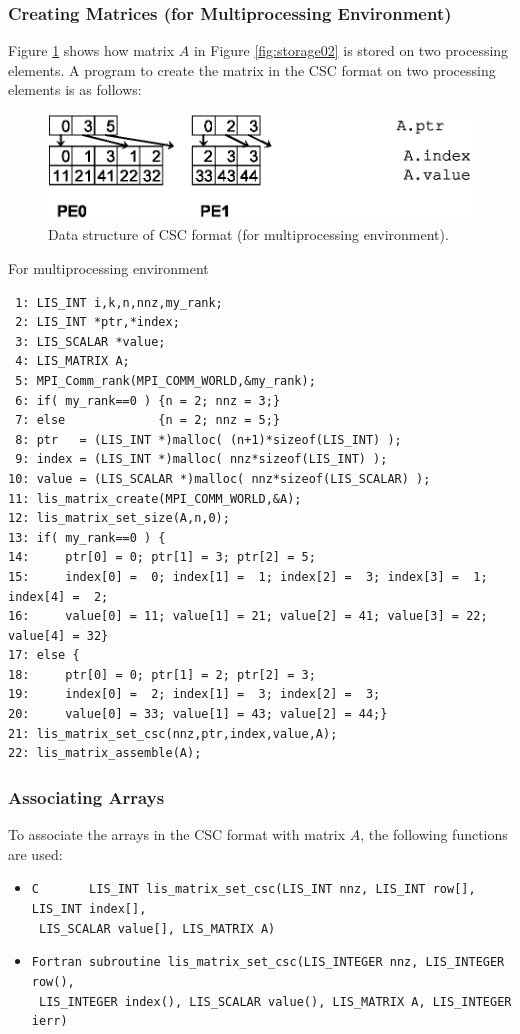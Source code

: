 \documentclass[a4paper]{article}
\begin{document}
\subsubsection{Creating Matrices (for Multiprocessing Environment)}
Figure \ref{fig:storage02_mpi} shows how matrix $A$ in Figure
\ref{fig:storage02} is stored on two processing elements. A program to create the
matrix in the CSC format on two processing elements is as follows:
\begin{figure}[h]
{\centering 
\includegraphics{storage02_mpi.eps} 
\caption{Data structure of CSC format (for multiprocessing environment).}\label{fig:storage02_mpi}}
\end{figure}
\begin{itemsquarebox}[l]{For multiprocessing environment}
\small
\begin{verbatim}
 1: LIS_INT i,k,n,nnz,my_rank;
 2: LIS_INT *ptr,*index;
 3: LIS_SCALAR *value;
 4: LIS_MATRIX A;
 5: MPI_Comm_rank(MPI_COMM_WORLD,&my_rank);
 6: if( my_rank==0 ) {n = 2; nnz = 3;}
 7: else             {n = 2; nnz = 5;}
 8: ptr   = (LIS_INT *)malloc( (n+1)*sizeof(LIS_INT) );
 9: index = (LIS_INT *)malloc( nnz*sizeof(LIS_INT) );
10: value = (LIS_SCALAR *)malloc( nnz*sizeof(LIS_SCALAR) );
11: lis_matrix_create(MPI_COMM_WORLD,&A);
12: lis_matrix_set_size(A,n,0);
13: if( my_rank==0 ) {
14:     ptr[0] = 0; ptr[1] = 3; ptr[2] = 5;
15:     index[0] =  0; index[1] =  1; index[2] =  3; index[3] =  1; index[4] =  2;
16:     value[0] = 11; value[1] = 21; value[2] = 41; value[3] = 22; value[4] = 32}
17: else {
18:     ptr[0] = 0; ptr[1] = 2; ptr[2] = 3;
19:     index[0] =  2; index[1] =  3; index[2] =  3;
20:     value[0] = 33; value[1] = 43; value[2] = 44;}
21: lis_matrix_set_csc(nnz,ptr,index,value,A);
22: lis_matrix_assemble(A);
\end{verbatim}
\end{itemsquarebox}

\subsubsection{Associating Arrays}
To associate the arrays in the CSC format with matrix $A$, the following functions are used:
\begin{itemize}
\item \verb|C       LIS_INT lis_matrix_set_csc(LIS_INT nnz, LIS_INT row[], LIS_INT index[],|\\
      \verb| LIS_SCALAR value[], LIS_MATRIX A)|
\item \verb|Fortran subroutine lis_matrix_set_csc(LIS_INTEGER nnz, LIS_INTEGER row(),|\\
      \verb| LIS_INTEGER index(), LIS_SCALAR value(), LIS_MATRIX A, LIS_INTEGER ierr)|
\end{itemize}
\end{document}
